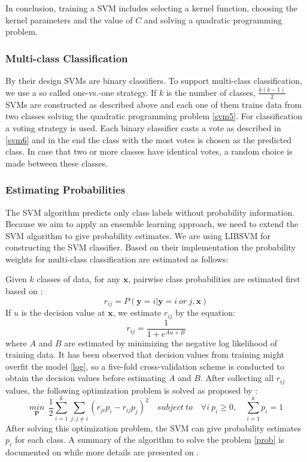 \documentclass[a4paper,11pt,oneside]{article}
\begin{document}
In conclusion, training a SVM includes selecting a kernel function, choosing the kernel parameters and the value of $C$ and
solving a quadratic programming problem.
\subsubsection*{Multi-class Classification}
By their design SVMs are binary classifiers. To support multi-class classification, we use a so called one-vs.-one strategy.
If $k$ is the number of classes, $\frac{k(k-1)}{2}$ SVMs are constructed as described above and each one of them 
trains data from two classes solving the quadratic programming problem \ref{svm5}. For classification a voting strategy is used. Each binary classifier casts a vote
as described in \ref{svm6}
and in the end the class with the most votes is chosen as the predicted class. In case that two or more classes have identical votes, 
a random choice is made between these classes.
\subsubsection*{Estimating Probabilities}
The SVM algorithm predicts only class labels without probability information. Because we aim to apply an ensemble
learning approach, we need to extend the SVM algorithm to give probability estimates. We are using LIBSVM \cite{chang2011libsvm} for 
constructing the SVM classifier. Based on their implementation the probability weights for multi-class classification 
are estimated as follows:

Given $k$ classes of data, for any $\mathbf{x}$, pairwise class probabilities are estimated first based on \cite{lin2007note}:
\begin{equation*}
  r_{ij} = P(\mathbf{y}=i|\mathbf{y}=i\ or \ j,\mathbf{x})
\end{equation*}
If $u$ is the decision value at $\mathbf{x}$, we estimate $r_{ij}$ by the equation:
\begin{equation}\label{log}
  r_{ij} = \frac{1}{1+e^{Au+B}}
\end{equation}
where $A$ and $B$ are estimated by minimizing the negative log likelihood of training data. It has been observed that
decision values from training might overfit the model \ref{log}, so a five-fold cross-validation scheme is conducted to obtain
the decision values before estimating $A$ and $B$. After collecting all $r_{ij}$ values, the following optimization
problem is solved as proposed by \cite{wu2004probability}:
\begin{equation}\label{prob}
  \underset{\mathbf{P}}{min} \ \ \frac{1}{2}\sum_{i=1}^k \sum_{j:j\neq i}(r_{ji}p_i-r_{ij}p_j)^2
  \quad subject \ to \quad \forall i \ p_i\geq 0 ,\quad \sum_{i=1}^k p_i = 1 
\end{equation} 
After solving this optimization problem, the SVM can give probability estimates $p_i$ for each class.
A summary of the algorithm to solve the problem \ref{prob} is documented on \cite{chang2011libsvm} while 
more details are presented on \cite{wu2004probability}.
\end{document}
